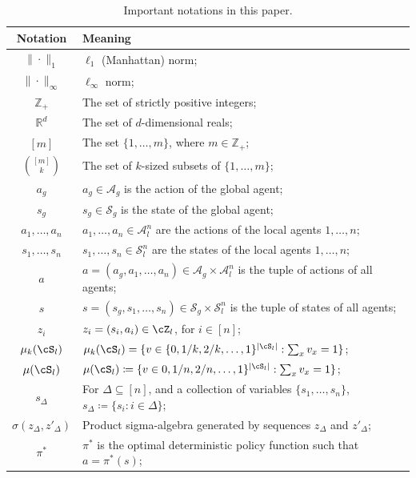 \documentclass{article}
\theoremstyle{plain}
\theoremstyle{definition}
\newcommand{\nocontentsline}[3]{}
\let\origtoc=\addcontentsline
\let\addcontentsline=\nocontentsline
\begin{document}
\let\addcontentsline=\origtoc


\begin{table}[hbt!]
  \centering
  \caption{Important notations in this paper.}\label{table:notations}
  \begin{tabular}{c|l}
  \hline
    \textbf{Notation} & \textbf{Meaning} \\
 \hline
    $\|\cdot\|_1$ & $\ell_1$ (Manhattan) norm; \\
    $\|\cdot\|_\infty$ & $\ell_\infty$ norm; \\
    $\mathbb{Z}_{+}$ & The set of strictly positive integers; \\
    $\mathbb{R}^d$ & The set of $d$-dimensional reals;\\
    $[m]$ & The set $\{1,\dots,m\}$, where $m\in\mathbb{Z}_+$;  \\
    ${[m]\choose k}$ & The set of $k$-sized subsets of $\{1,\dots,m\}$;\\
    $a_g$ & $a_g\in\mathcal{A}_g$ is the action of the global agent;\\
    $s_g$ & $s_g\in\mathcal{S}_g$ is the state of the global agent;\\
    $a_1,\dots,a_n$ & $a_{1},\dots,a_n\in\mathcal{A}_l^n$ are the actions of the local agents $1,\dots,n$;\\
    $s_1,\dots,s_n$ & $s_{1},\dots,s_n\in\mathcal{S}_l^n$ are the states of the local agents $1,\dots,n$;\\
    $a$ & $a=(a_g,a_1,\dots,a_n)\in\mathcal{A}_g\times\mathcal{A}_l^n$ is the tuple of actions of all agents;\\
    $s$ & $s=(s_g,s_1,\dots,s_n)\in\mathcal{S}_g\times\mathcal{S}_l^n$ is the tuple of states of all agents;\\
    $z_i$ & $z_i = (s_i,a_i) \in \cZ_l$, for $i\in[n]$;\\
    $\mu_k(\cS_l)$ &  $\mu_k(\cS_l) = \{v \in \{0,1/k,2/k,\dots,1\}^{|\cS_l|}: \sum_x v_x = 1\}$; \\ 
    $\mu(\cS_l)$ &  $\mu(\cS_l) \coloneq \{v\in 0,1/n,2/n,\dots,1\}^{|\cS_l|}: \sum_x v_x = 1\}$; \\ 
    $s_\Delta$ & For $\Delta\subseteq [n]$, and a collection of variables $\{s_1,\dots,s_n\}$, $s_\Delta\coloneq\{s_i: i\in\Delta\}$;\\
    $\sigma(z_{\Delta}, z'_{\Delta})$ & Product sigma-algebra generated by sequences $z_{\Delta}$ and $z'_{\Delta}$; \\
    $\pi^*$ & $\pi^*$ is the optimal deterministic policy function such that $a = \pi^*(s)$; \\

\end{tabular}
\end{table}
\end{document}
